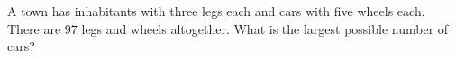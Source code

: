 A town has inhabitants with three legs each and cars with five wheels each. There are $97$ legs and wheels altogether. What is the largest possible number of cars?
